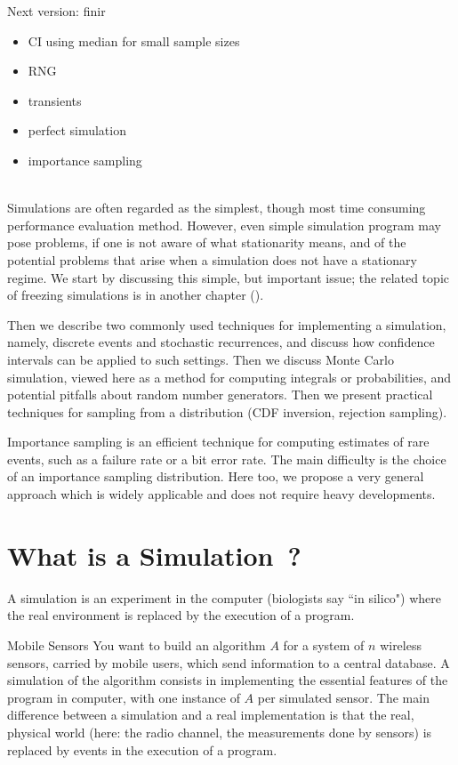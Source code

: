 \ifnfs
Next version: finir

  \begin{itemize}
    \item CI using median for small sample sizes
    \item RNG
    \item transients
    \item perfect simulation
    \item importance sampling
    \end{itemize}
\fi

~\\
Simulations are often regarded as the simplest, though most
time consuming performance evaluation method. However, even
simple simulation program may pose problems, if one is not
aware of what stationarity means, and of the potential problems
that arise when a simulation does not have a stationary regime.
We start by discussing this simple, but important issue; the
related topic of freezing simulations is in another chapter
().

Then we describe two commonly used techniques for implementing
a simulation, namely, discrete events and stochastic
recurrences, and discuss how confidence intervals can be
applied to such settings. Then we discuss Monte Carlo
simulation, viewed here as a method for computing integrals or
probabilities, and potential pitfalls about random number
generators. Then we present practical techniques for sampling
from a distribution (CDF inversion, rejection sampling).

Importance sampling is an efficient technique for computing
estimates of rare events, such as a failure rate or a bit error
rate. The main difficulty is the choice of an importance sampling distribution. Here too, we propose a very general approach which is
widely applicable and does not require heavy developments.

\minitoc
\section{What is a Simulation~?}

A simulation is an experiment in the computer (biologists say ``in
silico") where the real environment is replaced by the execution
of a program.
\begin{ex}{Mobile Sensors}
 You want to build an algorithm $A$ for a
system of $n$ wireless sensors, carried by mobile users, which
send information to a central database. A simulation of the
algorithm consists in implementing the essential features of the
program in computer, with one instance of $A$ per simulated
sensor. The main difference between a simulation and a real
implementation is that the real, physical world (here: the radio
channel, the measurements done by sensors) is replaced by events
in the execution of a program.
\end{ex}

